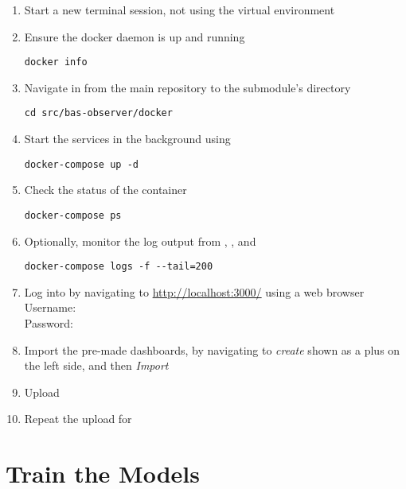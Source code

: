 \begin{enumerate}
	\item Start a new terminal session, not using the virtual environment
	\item Ensure the docker daemon is up and running
\begin{lstlisting}
docker info
\end{lstlisting}
	\item Navigate in from the main repository to the  submodule's  directory
\begin{lstlisting}
cd src/bas-observer/docker
\end{lstlisting}
	\item Start the services in the background using 
\begin{lstlisting}
docker-compose up -d
\end{lstlisting}
	\item Check the status of the container
\begin{lstlisting}
docker-compose ps
\end{lstlisting}
	\item Optionally, monitor the log output from , , and 
\begin{lstlisting}
docker-compose logs -f --tail=200
\end{lstlisting}
	\item Log into  by navigating to \url{http://localhost:3000/} using a web browser\\
		Username: \\
		Password: 
	\item Import the pre-made dashboards, by navigating to \emph{create} shown as a plus on the left side, and then \emph{Import}
	\item Upload 
	\item Repeat the upload for 
\end{enumerate}

\section{Train the Models}
\label{app:reproduce:train}


